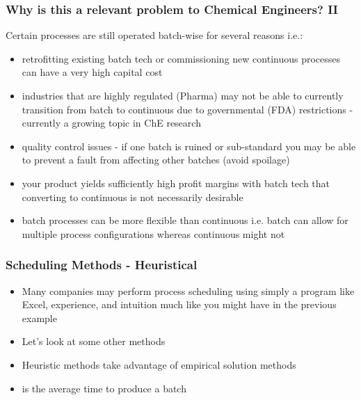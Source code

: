 \begin{frame}\frametitle{Why is this a relevant problem to Chemical Engineers? II}
	Certain processes are still operated batch-wise for several reasons i.e.:
	\begin{itemize}
		\item	retrofitting existing batch tech or commissioning new continuous processes can have a very high capital cost			
		\item	industries that are highly regulated (Pharma) may not be able to currently transition from batch to continuous due to governmental (FDA) restrictions - currently a growing topic in ChE research			
		\item	quality control issues - if one batch is ruined or sub-standard you may be able to prevent a fault from affecting other batches (avoid spoilage)			
		\item	your product yields sufficiently high profit margins with batch tech that converting to continuous is not necessarily desirable			
		\item	batch processes can be more flexible than continuous i.e. batch can allow for multiple process configurations whereas continuous might not
	\end{itemize}
\end{frame}

\begin{frame}\frametitle{Scheduling Methods - Heuristical}
	\begin{itemize}
		\item	Many companies may perform process scheduling using simply a program like Excel, experience, and intuition much like you might have in the previous example		
		\item	Let's look at some other methods		
		\item	Heuristic methods take advantage of empirical solution methods \cite{MendyNco06}
	\end{itemize}
	\begin{itemize}
		\item	{} is the average time to produce a batch 
	\end{itemize}
\end{frame}

